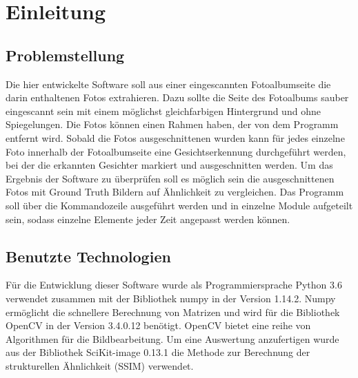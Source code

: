 \chapter{Einleitung}

\section{Problemstellung}

Die hier entwickelte Software soll aus einer eingescannten Fotoalbumseite die darin enthaltenen Fotos extrahieren. Dazu sollte die Seite des Fotoalbums sauber eingescannt sein mit einem möglichst gleichfarbigen Hintergrund und ohne Spiegelungen. Die Fotos können einen Rahmen haben, der von dem Programm entfernt wird.
Sobald die Fotos ausgeschnittenen wurden kann für jedes einzelne Foto innerhalb der Fotoalbumseite eine Gesichtserkennung durchgeführt werden, bei der die erkannten Gesichter markiert und ausgeschnitten werden.
Um das Ergebnis der Software zu überprüfen soll es möglich sein die ausgeschnittenen Fotos mit Ground Truth Bildern auf Ähnlichkeit zu vergleichen. Das Programm soll über die Kommandozeile ausgeführt werden und in einzelne Module aufgeteilt sein, sodass einzelne Elemente jeder Zeit angepasst werden können.
 
\section{Benutzte Technologien}
Für die Entwicklung dieser Software wurde als Programmiersprache Python 3.6 verwendet zusammen mit der Bibliothek numpy in der Version 1.14.2. Numpy ermöglicht die schnellere Berechnung von Matrizen und wird für die Bibliothek OpenCV in der Version 3.4.0.12 benötigt. OpenCV bietet eine reihe von Algorithmen für die Bildbearbeitung. Um eine Auswertung anzufertigen wurde aus der Bibliothek SciKit-image 0.13.1 die Methode zur Berechnung der strukturellen Ähnlichkeit (SSIM) verwendet.

